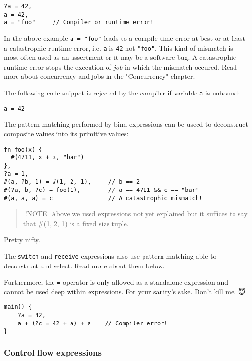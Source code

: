 \begin{verbatim}
?a = 42,
a = 42,
a = "foo"     // Compiler or runtime error!
\end{verbatim}

In the above example \texttt{a\ =\ "foo"} leads to a compile time error
at best or at least a catastrophic runtime error, i.e. \texttt{a} is
\texttt{42} not \texttt{"foo"}. This kind of mismatch is most often used
as an assertment or it may be a software bug. A catastrophic runtime
error stops the execution of \emph{job} in which the mismatch occured.
Read more about concurrency and jobs in the "Concurrency" chapter.

The following code snippet is rejected by the compiler if variable
\texttt{a} is unbound:

\texttt{a\ =\ 42}

The pattern matching performed by bind expressions can be useed to
deconstruct composite values into its primitive values:

\begin{verbatim}
fn foo(x) {
  #(4711, x + x, "bar")
},
?a = 1,
#(a, ?b, 1) = #(1, 2, 1),     // b == 2
#(?a, b, ?c) = foo(1),        // a == 4711 && c == "bar"
#(a, a, a) = c                // A catastrophic mismatch!
\end{verbatim}

\begin{quote}
{[}!NOTE{]} Above we used expressions not yet explained but it suffices
to say that \#(1, 2, 1) is a fixed size tuple.
\end{quote}

Pretty nifty.

The \texttt{switch} and \texttt{receive} expressions also use pattern
matching able to deconstruct and select. Read more about them below.

Furthermore, the \texttt{=} operator is only allowed as a standalone
expression and cannot be used deep within expressions. For your sanity's
sake. Don't kill me. 😇

\begin{verbatim}
main() {
    ?a = 42,
    a + (?c = 42 + a) + a    // Compiler error!
}
\end{verbatim}

\hypertarget{control-flow-expressions}{%
\subsubsection{Control flow
expressions}\label{control-flow-expressions}}

